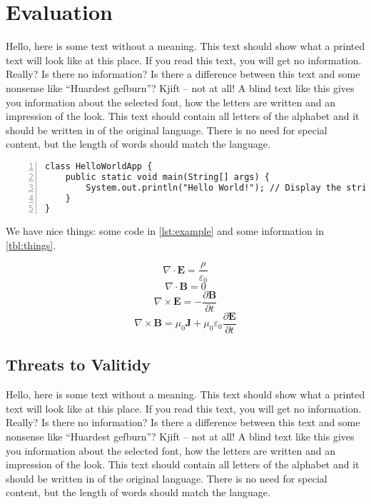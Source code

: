 \documentclass[%
  english,%
  todotools=true,%
  trtype=singlearticle%
]{hpitr}
\begin{document}
\section{Evaluation}
\label{sec:evaluation}

Hello, here is some text without a meaning. This text should show
what a printed text will look like at this place. If you read this
text, you will get no information. Really? Is there no information?
Is there a difference between this text and some nonsense like
“Huardest gefburn”? Kjift – not at all! A blind text like this gives
you information about the selected font, how the letters are written
and an impression of the look. This text should contain all letters
of the alphabet and it should be written in of the original
language. There is no need for special content, but the length of
words should match the language.

\lstset{language=Java}
\begin{lstlisting}[label=lst:example,caption={An example code snippet},float,numbers=left]
class HelloWorldApp {
    public static void main(String[] args) {
        System.out.println("Hello World!"); // Display the string.
    }
}
\end{lstlisting}

We have nice things: some code in \autoref{lst:example} and some
information in \autoref{tbl:things}.

\[\nabla \cdot \mathbf{E} = \frac{\rho}{\varepsilon_0}\]
\[\nabla \cdot \mathbf{B} = 0\]
\[\nabla \times \mathbf{E} = -\frac {\partial \mathbf{B}}{\partial t}\]
\[\nabla \times \mathbf{B} = \mu_0 \mathbf{J} + \mu_0\varepsilon_0  \frac{\partial \mathbf{E}}{\partial t}\]

\subsection{Threats to Valitidy}
\label{sec:threats-valitidy}

Hello, here is some text without a meaning. This text should show
what a printed text will look like at this place. If you read this
text, you will get no information. Really? Is there no information?
Is there a difference between this text and some nonsense like
“Huardest gefburn”? Kjift – not at all! A blind text like this gives
you information about the selected font, how the letters are written
and an impression of the look. This text should contain all letters
of the alphabet and it should be written in of the original
language. There is no need for special content, but the length of
words should match the language.
\end{document}
